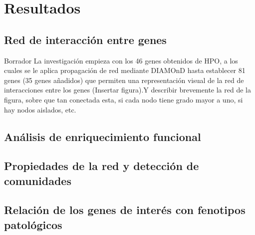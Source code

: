 \section{Resultados}

\subsection{Red de interacción entre genes}

Borrador
La investigación empieza con los 46 genes obtenidos de HPO, a los cuales se le aplica propagación de red mediante DIAMOnD hasta establecer 81 genes (35 genes añadidos) que permiten una representación visual de la red de interacciones entre los genes (Insertar figura).Y describir brevemente la red de la figura, sobre que tan conectada esta, si cada nodo tiene grado mayor a uno, si hay nodos aislados, etc.

\subsection{Análisis de enriquecimiento funcional}

\subsection{Propiedades de la red y detección de comunidades}

\subsection{Relación de los genes de interés con fenotipos patológicos}
